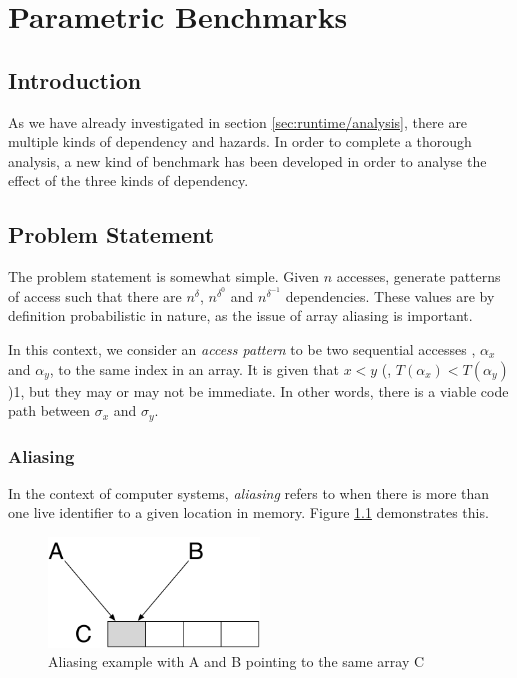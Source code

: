 \chapter{Parametric Benchmarks} \label{chp:parametric}
\section{Introduction} \label{sec:parametric/introduction}
As we have already investigated in section \ref{sec:runtime/analysis}, there are multiple kinds of dependency and hazards. In order to complete a thorough analysis, a new kind of benchmark has been developed in order to analyse the effect of the three kinds of dependency.

\section{Problem Statement} \label{sec:parametric/problem}
The problem statement is somewhat simple. Given $n$ accesses, generate patterns of access such that there are $n^{\delta}$, $n^{\delta^{0}}$ and $n^{\delta^{-1}}$ dependencies. These values are by definition probabilistic in nature, as the issue of array aliasing is important.

In this context, we consider an \textit{access pattern} to be two sequential accesses , $\alpha_x$ and $\alpha_y$, to the same index in an array. It is given that $x < y$ (\ie, $T(\alpha_x) < T(\alpha_y)$)1, but they may or may not be immediate. In other words, there is a viable code path between $\sigma_x$ and $\sigma_y$.

	\subsection{Aliasing} \label{sec:parametric/problem/aliasing}
	In the context of computer systems, \textit{aliasing} refers to when there is more than one live identifier to a given location in memory. Figure \ref{fig:aliasing} demonstrates this.
	
	\begin{figure}[H]
		\centering
		\includegraphics[width=0.5\textwidth]{graphics/aliasing.pdf}
		\caption{Aliasing example with A and B pointing to the same array C}
		\label{fig:aliasing}
	\end{figure}
	
